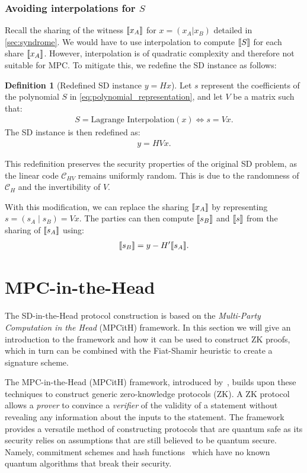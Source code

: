 \documentclass[11pt]{report}
\theoremstyle{definition}
\newtheorem{definition}{Definition}[section]
\theoremstyle{plain}
\begin{document}
\subsubsection{Avoiding interpolations for $S$}\label{sec:syndrome-avoid-interpolation}
Recall the sharing of the witness $\llbracket x_A \rrbracket$ for $x = (x_A | x_B)$ detailed in \autoref{sec:syndrome}. We would have to use interpolation to compute $\llbracket S \rrbracket$ for each share $\llbracket x_A \rrbracket$. However, interpolation is of quadratic complexity and therefore not suitable for MPC. To mitigate this, we redefine the SD instance as follows:

\begin{definition}[Redefined SD instance $y = Hx$]
  Let $s$ represent the coefficients of the polynomial $S$ in \autoref{eq:polynomial_representation}, and let $V$ be a matrix such that:
  \begin{align*}
    S = \text{Lagrange Interpolation}(x) \Leftrightarrow s = Vx.
  \end{align*}
  The SD instance is then redefined as:
  \begin{align*}
    y = HVx.
  \end{align*}
\end{definition}

This redefinition preserves the security properties of the original SD problem, as the linear code $\mathcal{C}_{HV}$ remains uniformly random. This is due to the randomness of $\mathcal{C}_H$ and the invertibility of $V$.

With this modification, we can replace the sharing $\llbracket x_A \rrbracket$ by representing $s = (s_A \mid s_B) = Vx$. The parties can then compute $\llbracket s_B \rrbracket$ and $\llbracket s \rrbracket$ from the sharing of $\llbracket s_A \rrbracket$ using:
\begin{align*}
  \llbracket s_B \rrbracket = y - H'\llbracket s_A \rrbracket.
\end{align*}

\section{MPC-in-the-Head}\label{sec:mpcinth}

The SD-in-the-Head protocol construction is based on the \textit{Multi-Party Computation in the Head} (MPCitH) framework. In this section we will give an introduction to the framework and how it can be used to construct ZK proofs, which in turn can be combined with the Fiat-Shamir heuristic to create a signature scheme.

The MPC-in-the-Head (MPCitH) framework, introduced by~\cite{ishai2007zero}, builds upon these techniques to construct generic zero-knowledge protocols (ZK). A ZK protocol allows a \textit{prover} to convince a \textit{verifier} of the validity of a statement without revealing any information about the inputs to the statement. The framework provides a versatile method of constructing protocols that are quantum safe as its security relies on assumptions that are still believed to be quantum secure. Namely, commitment schemes and hash functions~\cite{feneuil2023threshold} which have no known quantum algorithms that break their security.
\end{document}
